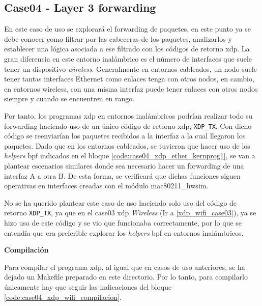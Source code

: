 \subsection{Case04 - Layer 3 forwarding	}
\label{xdp_wifi_case04}

En este caso de uso se explorará el forwarding de paquetes, en este punto ya se debe conocer como filtrar por las cabeceras de los paquetes, analizarlos y establecer una lógica asociada a ese filtrado con los códigos de retorno \gls{xdp}. La gran diferencia en este entorno inalámbrico es el número de interfaces que suele tener un dispositivo \textit{wireless}. Generalmente en entornos cableados, un nodo suele tener tantas interfaces Ethernet como enlaces tenga con otros nodos, en cambio, en entornos wireless, con una misma interfaz puede tener enlaces con otros nodos siempre y cuando se encuentren en rango.\\
\par
Por tanto, los programas \gls{xdp} en entornos inalámbricos podrían realizar todo su forwarding haciendo uso de un único código de retorno \gls{xdp}, \texttt{XDP\_TX}. Con dicho código se reenviarían los paquetes recibidos a la interfaz a la cual llegaron los paquetes. Dado que en los entornos cableados, se tuvieron que hacer uso de los \textit{helpers} \gls{bpf} indicados en el bloque \ref{code:case04_xdp_ether_kernprog1}, se van a plantear escenarios similares donde sea necesario hacer un forwarding de una interfaz A a otra B. De esta forma, se verificará que dichas funciones siguen operativas en interfaces creadas con el módulo mac80211\_hwsim.\\
\par
No se ha querido plantear este caso de uso haciendo solo uso  del código de retorno \texttt{XDP\_TX}, ya que en el case03 \gls{xdp} \textit{Wireless} (Ir a \ref{xdp_wifi_case03}),  ya se hizo uso de este código y se vio que funcionaba correctamente, por lo que se entendía que era preferible explorar los \textit{helpers} \gls{bpf} en entornos inalámbricos.
 


\vspace{0.5cm}
\textbf{Compilación}\\
\par

Para compilar el programa \gls{xdp}, al igual que en casos de uso anteriores, se ha dejado un Makefile preparado en este directorio. Por lo tanto, para compilarlo únicamente hay que seguir las indicaciones del bloque \ref{code:case04_xdp_wifi_compilacion}.

